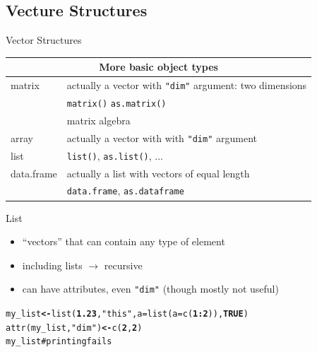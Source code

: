 \documentclass{beamer}\usepackage[]{graphicx}\usepackage[]{color}
\makeatletter
\newcommand{\hlnum}[1]{\textcolor[rgb]{0.502,0,0.502}{\textbf{#1}}}%
\newcommand{\hlstr}[1]{\textcolor[rgb]{0.651,0.522,0}{#1}}%
\newcommand{\hlcom}[1]{\textcolor[rgb]{1,0.502,0}{#1}}%
\newcommand{\hlopt}[1]{\textcolor[rgb]{1,0,0.502}{\textbf{#1}}}%
\newcommand{\hlstd}[1]{\textcolor[rgb]{0,0,0}{#1}}%
\newcommand{\hlkwb}[1]{\textcolor[rgb]{0.502,0.502,0.753}{\textbf{#1}}}%
\newcommand{\hlkwc}[1]{\textcolor[rgb]{0,0.502,0.753}{#1}}%
\newcommand{\hlkwd}[1]{\textcolor[rgb]{0,0.267,0.4}{#1}}%
\newenvironment{kframe}{%
 \def\at@end@of@kframe{}%
 \ifinner\ifhmode%
  \def\at@end@of@kframe{\end{minipage}}%
  \begin{minipage}{\columnwidth}%
 \fi\fi%
 \def\FrameCommand##1{\hskip\@totalleftmargin \hskip-\fboxsep
 \colorbox{shadecolor}{##1}\hskip-\fboxsep
     \hskip-\linewidth \hskip-\@totalleftmargin \hskip\columnwidth}%
 \MakeFramed {\advance\hsize-\width
   \@totalleftmargin\z@ \linewidth\hsize
   \@setminipage}}%
 {\par\unskip\endMakeFramed%
 \at@end@of@kframe}
\newenvironment{knitrout}{}{} %
\makeatother
\begin{document}
\subsection{Vecture Structures}


\begin{frame}[fragile]{Vector Structures}

\begin{center}
  \begin{tabular}{| l | l |}
    \hline
    \multicolumn{2}{|c|}{More basic object types} \\ \hline
    matrix      & actually a vector with \texttt{"dim"} argument: two dimensions \\
                & \texttt{matrix()} \texttt{as.matrix()} \\ 
                & matrix algebra \\ 
    array       & actually a vector with with \texttt{"dim"} argument \\            \hline
    list        & \texttt{list()}, \texttt{as.list()}, ...  \\ 
    data.frame  & actually a list with vectors of equal length  \\
                & \texttt{data.frame}, \texttt{as.dataframe}  \\

    \hline
  \end{tabular}
\end{center}

\end{frame}



\begin{frame}[fragile]{List}

\begin{itemize}
  \item ``vectors'' that can contain any type of element
  \item including lists $\rightarrow$ recursive
  \item can have attributes, even \texttt{"dim"} (though mostly not useful)
\end{itemize}

\begin{knitrout}
\color{fgcolor}\begin{kframe}
\begin{alltt}
\hlstd{my_list} \hlkwb{<-} \hlkwd{list}\hlstd{(}\hlnum{1.23}\hlstd{,} \hlstr{"this"}\hlstd{,} \hlkwc{a} \hlstd{=} \hlkwd{list}\hlstd{(}\hlkwc{a} \hlstd{=} \hlkwd{c}\hlstd{(}\hlnum{1}\hlopt{:}\hlnum{2}\hlstd{)),} \hlnum{TRUE}\hlstd{)}
\hlkwd{attr}\hlstd{(my_list,} \hlstr{"dim"}\hlstd{)} \hlkwb{<-} \hlkwd{c}\hlstd{(}\hlnum{2}\hlstd{,} \hlnum{2}\hlstd{)}
\hlstd{my_list}  \hlcom{# printing fails}
\end{alltt}
\end{kframe}
\end{knitrout}

\end{frame}
\end{document}
